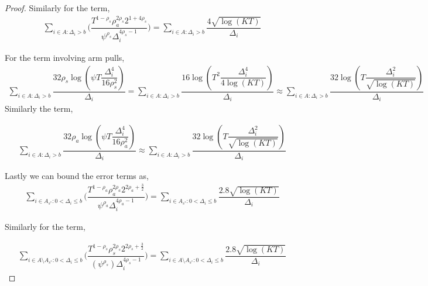 \begin{proof}
	Similarly for the term,
	\begin{align*}
	\sum_{i\in A:\Delta_{i} > b}\bigg(\dfrac{T^{1-\rho_{s}}\rho_{a}^{2\rho_{s}}2^{1+4\rho_{s}}}{\psi^{\rho_{s}}\Delta_{i}^{4\rho_{s}-1}} \bigg) = \sum_{i\in A:\Delta_{i} > b}\dfrac{4\sqrt{\log (KT)}}{\Delta_{i}}
	\end{align*}		
			
	
	For the term involving arm pulls,
	\begin{align*}
	\sum_{i\in A:\Delta_{i} > b}\dfrac{32\rho_{s}\log{(\psi T\dfrac{\Delta_{i}^{4}}{16\rho_{s}^{2}})}}{\Delta_{i}}=\sum_{i\in A:\Delta_{i} > b}\dfrac{16\log{(T^{2}\dfrac{\Delta_{i}^{4}}{4\log (KT)})}}{\Delta_{i}}\approx \sum_{i\in A:\Delta_{i} > b}\dfrac{32\log{(T\dfrac{\Delta_{i}^{2}}{\sqrt{\log (KT)}})}}{\Delta_{i}}
	\end{align*}		
	 Similarly the term, 
	
	\begin{align*}
	\sum_{i\in A:\Delta_{i} > b}\dfrac{32\rho_{a}\log{(\psi T\dfrac{\Delta_{i}^{4}}{16\rho_{a}^{2}})}}{\Delta_{i}}\approx \sum_{i\in A:\Delta_{i} > b}\dfrac{32\log{(T\dfrac{\Delta_{i}^{2}}{\sqrt{\log (KT)}})}}{\Delta_{i}}
	\end{align*}		 
	 

	Lastly we can bound the error terms as, 
	\begin{align*}
	\sum\limits_{i\in A_{s^{*}}:0 < \Delta_{i}\leq b}\bigg(\dfrac{T^{1-\rho_{a}}\rho_{a}^{2\rho_{a}}2^{2\rho_{a}+\frac{3}{2}}}{\psi^{\rho_{a}}\Delta_{i}^{4\rho_{a}-1}} \bigg)= \sum\limits_{i\in A_{s^{*}}:0 < \Delta_{i}\leq b}\dfrac{2.8\sqrt{\log (KT)}}{\Delta_{i}}
	\end{align*}
	
	
	Similarly for the term,
	
	\begin{align*}
	\sum_{i\in A\setminus A_{s^*}: 0 < \Delta_{i} \leq b}\bigg(\dfrac{T^{1-\rho_{s}}\rho_{s}^{2\rho_{s}}2^{2\rho_{s}+\frac{3}{2}}}{(\psi^{\rho_{s}})\Delta_{i}^{4\rho_{s} -1}} \bigg)=\sum_{i\in A\setminus A_{s^*}: 0 < \Delta_{i} \leq b}\dfrac{2.8\sqrt{\log (KT)}}{\Delta_{i}}
	\end{align*}	 
		

\end{proof}
